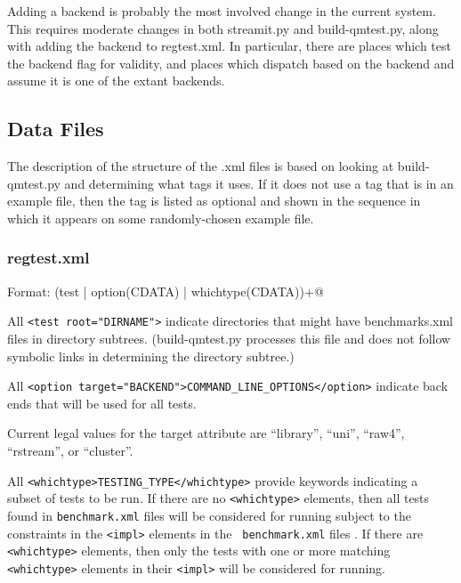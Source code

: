 \documentclass[11pt]{article}
\begin{document}
Adding a backend is probably the most involved change in the current
system.  This requires moderate changes in both \textsf{streamit.py}
and \textsf{build-qmtest.py}, along with adding the backend to
\textsf{regtest.xml}.  In particular, there are places which test the
backend flag for validity, and places which dispatch based on the
backend and assume it is one of the extant backends.

\subsection{Data Files}
The description of the structure of the .xml files is based on looking
at build-qmtest.py and determining what tags it uses.  If it does not
use a tag that is in an example file, then the tag is listed as
optional and shown in the sequence in which it appears on some
randomly-chosen example file.

\subsubsection{regtest.xml}
Format: \verb@regtest (test | option(CDATA) | whichtype(CDATA))+@

All \verb+<test root="DIRNAME">+ indicate directories that might have 
benchmarks.xml files in directory subtrees. (build-qmtest.py processes
this file and does not follow symbolic links in determining the
directory subtree.)

All \verb+<option target="BACKEND">COMMAND_LINE_OPTIONS</option>+
indicate back ends that will be used for all tests.

Current legal values for the target attribute are  ``library'', ``uni'', 
``raw4'', ``rstream'', or ``cluster''.

All \verb+<whichtype>TESTING_TYPE</whichtype>+ provide keywords indicating a 
subset of tests to be run.
If there are no \verb+<whichtype>+ elements, then all tests found in
{\tt benchmark.xml} files will be considered for running subject to
the constraints in the \verb+<impl>+ elements in the {\tt
benchmark.xml} files .
If there are \verb+<whichtype>+ elements, then only the tests with one
or more matching \verb+<whichtype>+ elements in their \verb+<impl>+
will be considered for running.
\end{document}
